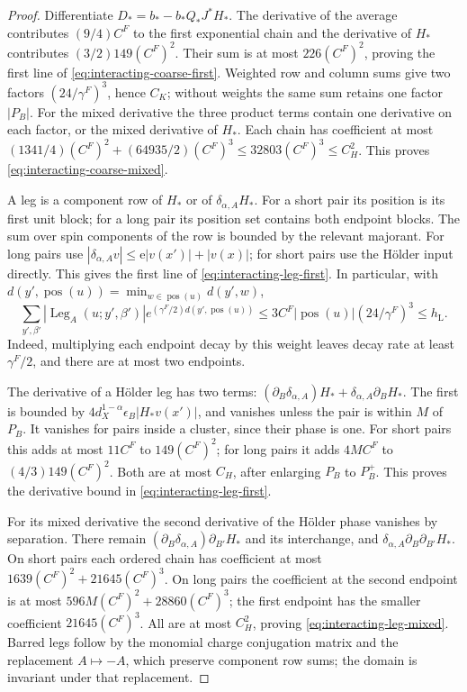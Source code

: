 \begin{proof}
Differentiate $D_*=b_*-b_*Q_*J^*H_*$.
The derivative of the average contributes
$(9/4)C^F$ to the first exponential chain and
the derivative of $H_*$ contributes
$(3/2)149(C^F)^2$. Their sum is at most
$226(C^F)^2$, proving the first line of
\eqref{eq:interacting-coarse-first}.
Weighted row and column sums give two factors
$(24/\gamma^F)^3$, hence $C_K$; without weights
the same sum retains one factor $|P_B|$.
For the mixed derivative the three product
terms contain one derivative on each factor,
or the mixed derivative of $H_*$. Each chain
has coefficient at most
$(1341/4)(C^F)^2+(64935/2)(C^F)^3
\le32803(C^F)^3\le C_H^2$.
This proves \eqref{eq:interacting-coarse-mixed}.

A leg is a component row of $H_*$ or of
$\delta_{\alpha,A}H_*$. For a short pair its
position is its first unit block; for a long
pair its position set contains both endpoint
blocks. The sum over spin components of the
row is bounded by the relevant majorant.
For long pairs use
$|\delta_{\alpha,A}v|\le\mathrm e|v(x')|+|v(x)|$;
for short pairs use the Hölder input directly.
This gives the first line of
\eqref{eq:interacting-leg-first}. In particular, with
$d(y',\operatorname{pos}(u))=\min_{w\in\operatorname{pos}(u)}d(y',w)$,
\[
 \sum_{y',\beta'}|\operatorname{Leg}_A(u;y',\beta')|
       e^{(\gamma^F/2)d(y',\operatorname{pos}(u))}
 \le3C^F|\operatorname{pos}(u)|(24/\gamma^F)^3
 \le h_{\mathrm L}.
\]
Indeed, multiplying each endpoint decay by this weight leaves
decay rate at least $\gamma^F/2$, and there are at most two endpoints.

The derivative of a Hölder leg has two terms:
$(\partial_B\delta_{\alpha,A})H_*+
\delta_{\alpha,A}\partial_BH_*$.
The first is bounded by
$4d_X^{1-\alpha}\epsilon_B|H_*v(x')|$,
and vanishes unless the pair is within $M$
of $P_B$. It vanishes for pairs inside a
cluster, since their phase is one.
For short pairs this adds at most
$11C^F$ to $149(C^F)^2$; for long pairs
it adds $4MC^F$ to $(4/3)149(C^F)^2$.
Both are at most $C_H$, after enlarging
$P_B$ to $P_B^+$. This proves the derivative
bound in \eqref{eq:interacting-leg-first}.

For its mixed derivative the second derivative
of the Hölder phase vanishes by separation.
There remain
$(\partial_B\delta_{\alpha,A})\partial_{B'}H_*$
and its interchange, and
$\delta_{\alpha,A}\partial_B\partial_{B'}H_*$.
On short pairs each ordered chain has
coefficient at most
$1639(C^F)^2+21645(C^F)^3$.
On long pairs the coefficient at the second
endpoint is at most
$596M(C^F)^2+28860(C^F)^3$;
the first endpoint has the smaller coefficient
$21645(C^F)^3$. All are at most $C_H^2$,
proving \eqref{eq:interacting-leg-mixed}.
Barred legs follow by the monomial charge
conjugation matrix and the replacement $A\mapsto-A$,
which preserve component row sums; the domain
is invariant under that replacement.
\end{proof}


